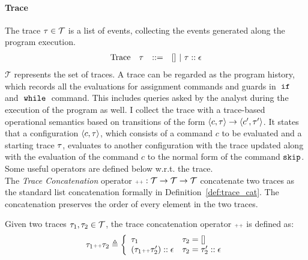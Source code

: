 \paragraph{Trace}
The trace $\mathtt{\tau} \in \mathcal{T} $ is a list of events, 
collecting the events generated along the program execution. 
\[
\begin{array}{llll}
\mbox{Trace} & \mathtt{\tau}
& ::= & [] ~|~ \mathtt{\tau} :: \mathtt{\epsilon}
\end{array}
\]
$\mathcal{T} $ represents the set of traces. 
A trace can be regarded as the program history, 
which records all the evaluations for assignment commands and guards in $\;\mathtt{if}\;$ and $\;\mathtt{while}\;$ command.
This includes queries asked by the analyst during the execution of the program as well. 
I collect the trace with a trace-based operational semantics based on transitions 
of the form $ \langle c, \mathtt{\tau} \rangle \to \langle c', \mathtt{\tau}' \rangle $. 
It states that a configuration $\langle c, \mathtt{\tau} \rangle$,
which consists of a command $c$ to be evaluated and a starting trace $\mathtt{\tau}$, 
evaluates to another configuration with the trace updated along with the evaluation of the command $c$ to the normal form of the command $\mathtt{skip}$.
%
\\
Some useful operators are defined below w.r.t. the trace.
\\
The \emph{Trace Concatenation} operator ${\scriptscriptstyle ++}: \mathcal{T} \to \mathcal{T} \to \mathcal{T}$ concatenate two traces
as the standard list concatenation formally
in Definition~\ref{def:trace_cat}.
The concatenation preserves the order of every element in the two traces.
\begin{defn}
  \label{def:trace_cat}
  Given two traces $\mathtt{\tau}_1, \mathtt{\tau}_2 \in \mathcal{T}$, the trace concatenation operator 
  ${\scriptscriptstyle ++}$ is defined as:
  \[
    \trace_1 \tracecat \trace_2 \triangleq
    \left\{
    \begin{array}{ll} 
       \trace_1 & \trace_2 = [] \\
       (\trace_1  \tracecat \trace_2')  :: \event & \trace_2 = \trace_2' :: \event
    \end{array}
    \right.
  \]
  \end{defn}
